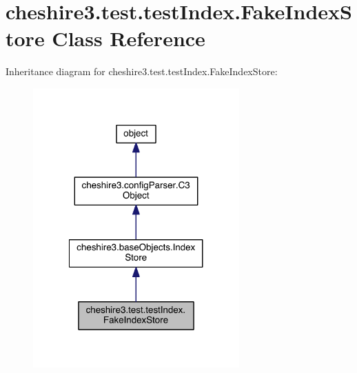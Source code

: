 \hypertarget{classcheshire3_1_1test_1_1test_index_1_1_fake_index_store}{\section{cheshire3.\-test.\-test\-Index.\-Fake\-Index\-Store Class Reference}
\label{classcheshire3_1_1test_1_1test_index_1_1_fake_index_store}
}


Inheritance diagram for cheshire3.\-test.\-test\-Index.\-Fake\-Index\-Store\-:
\nopagebreak
\begin{figure}[H]
\begin{center}
\leavevmode
\includegraphics[width=224pt]{classcheshire3_1_1test_1_1test_index_1_1_fake_index_store__inherit__graph}
\end{center}
\end{figure}


